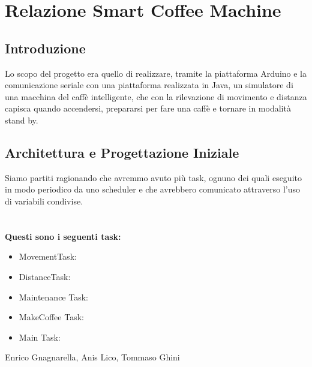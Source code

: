 \documentclass[a4paper]{article}
\begin{document}
\section*{Relazione Smart Coffee Machine} 
\subsection*{Introduzione}
Lo scopo del progetto era quello di realizzare, tramite la piattaforma Arduino e la comunicazione seriale con una piattaforma realizzata in Java, un simulatore di una macchina del caffè intelligente, che con la rilevazione di movimento e distanza capisca quando accendersi, prepararsi per fare una caffè e tornare in modalità stand by.
\subsection*{Architettura e Progettazione Iniziale}
Siamo partiti ragionando che avremmo avuto più task, ognuno dei quali eseguito in modo periodico da uno scheduler e che avrebbero comunicato attraverso l'uso di variabili condivise.\\ \\ \\
\textbf{Questi sono i seguenti task:}
\begin{itemize}
\item {MovementTask}:


\item {DistanceTask}:



\item {Maintenance Task}:


\item {MakeCoffee Task}:



\item {Main Task}:







\end{itemize}
\newpage
\null
\vfill
Enrico Gnagnarella, Anis Lico, Tommaso Ghini
\clearpage
\end{document}
